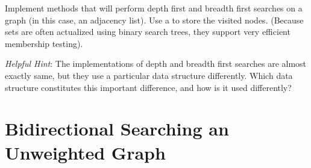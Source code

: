 \begin{problem}
Implement methods that will perform depth first and breadth first searches on a graph (in this case, an adjacency list).
Use a  to store the visited nodes. (Because sets are often actualized using binary search trees, they support very efficient membership testing).

\emph{Helpful Hint}: The implementations of depth and breadth first searches are almost exactly same, but they use a particular data structure differently. Which data structure constitutes this important difference, and how is it used differently?
\end{problem}

\section*{Bidirectional Searching an Unweighted Graph}

